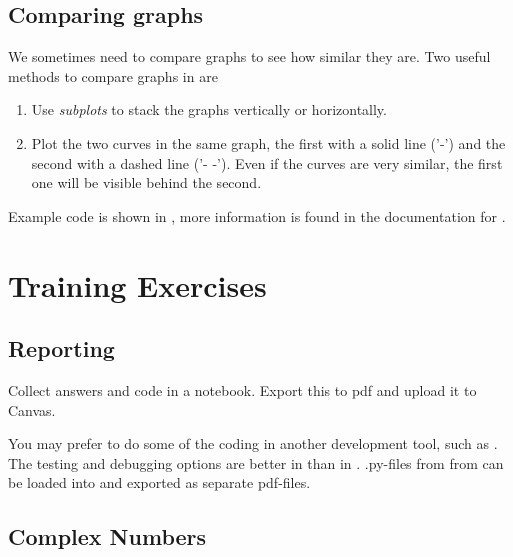 	
\subsection{Comparing graphs}
We sometimes need to compare graphs to see how similar they are.
Two useful methods to compare graphs in \matplotlib are
\begin{enumerate}[1)]
	\item Use \emph{subplots} to stack the graphs vertically or horizontally.
	
	\item Plot  the two curves in the same graph, the first with a solid line ('-') and the second with a dashed line ('- -'). Even if the curves are very similar, the first one will be visible behind the second.

\end{enumerate}

Example code is shown in , more information is found in the documentation for \matplotlib.
	


\section{Training Exercises}

\subsection*{Reporting}
Collect answers and code in a \jupyterlab notebook. Export this to pdf and upload it to Canvas.

You may prefer to do some of the coding in another development tool, such as \spyder. The testing and debugging options are better in \spyder than in \jupyterlab. .py-files from from \spyder can be loaded into \jupyterlab and exported as separate pdf-files.

\subsection{Complex Numbers}

